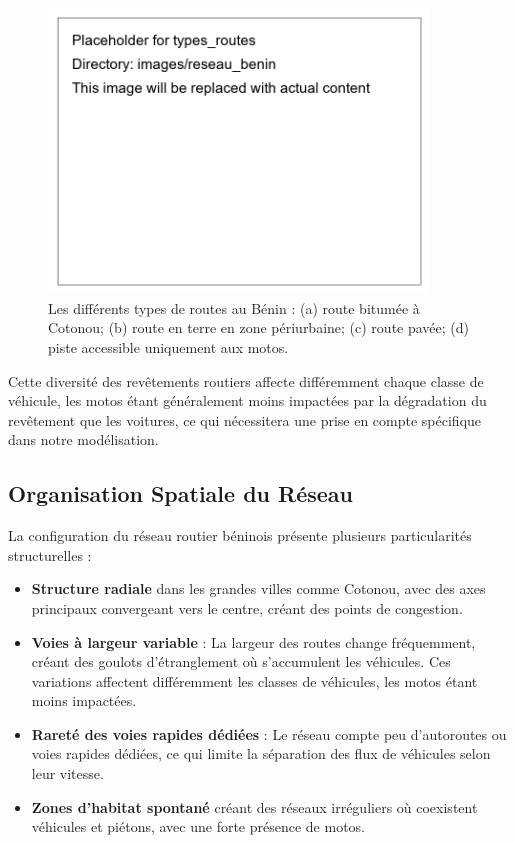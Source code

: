 \begin{figure}[htbp]
\centering
\includegraphics[width=0.9\textwidth]{images/reseau_benin/types_routes}
\caption{Les différents types de routes au Bénin : (a) route bitumée à Cotonou; (b) route en terre en zone périurbaine; (c) route pavée; (d) piste accessible uniquement aux motos.}
\label{fig:types_routes}
\end{figure}

\begin{remark}
Cette diversité des revêtements routiers affecte différemment chaque classe de véhicule, les motos étant généralement moins impactées par la dégradation du revêtement que les voitures, ce qui nécessitera une prise en compte spécifique dans notre modélisation.
\end{remark}

\subsection{Organisation Spatiale du Réseau}
\label{subsec:organisation_spatiale}

La configuration du réseau routier béninois présente plusieurs particularités structurelles :

\begin{itemize}
\item \textbf{Structure radiale} dans les grandes villes comme Cotonou, avec des axes principaux convergeant vers le centre, créant des points de congestion.

\item \textbf{Voies à largeur variable} : La largeur des routes change fréquemment, créant des goulots d'étranglement où s'accumulent les véhicules. Ces variations affectent différemment les classes de véhicules, les motos étant moins impactées.

\item \textbf{Rareté des voies rapides dédiées} : Le réseau compte peu d'autoroutes ou voies rapides dédiées, ce qui limite la séparation des flux de véhicules selon leur vitesse.

\item \textbf{Zones d'habitat spontané} créant des réseaux irréguliers où coexistent véhicules et piétons, avec une forte présence de motos.
\end{itemize}

